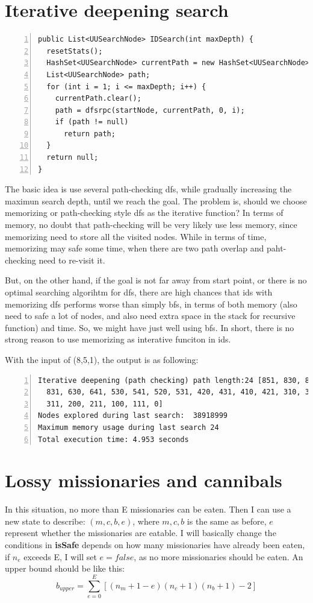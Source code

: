 \documentclass{article}
\begin{document}
\section{Iterative deepening search}

\begin{lstlisting}[numbers=left]
public List<UUSearchNode> IDSearch(int maxDepth) {
  resetStats();
  HashSet<UUSearchNode> currentPath = new HashSet<UUSearchNode>();
  List<UUSearchNode> path;
  for (int i = 1; i <= maxDepth; i++) {
    currentPath.clear();
    path = dfsrpc(startNode, currentPath, 0, i);
    if (path != null)
      return path;
  }
  return null;
}
\end{lstlisting}

The basic idea is use several path-checking dfs, while gradually increasing the maximun search depth, until we reach the goal. The problem is, should we choose memorizing or path-checking style dfs as the iterative function? In terms of memory, no doubt that path-checking will be very likely use less memory, since memorizing need to store all the visited nodes. While in terms of time, memorizing may safe some time, when there are two path overlap and paht-checking need to re-visit it. 

But, on the other hand, if the goal is not far away from start point, or there is no optimal searching algorihtm for dfs, there are high chances that ids with memorizing dfs performs worse than simply bfs, in terms of both memory (also need to safe a lot of nodes, and also need extra space in the stack for recursive function) and time. So, we might have just well using bfs. In short, there is no strong reason to use memorizing as interative funciton in ids.

With the input of (8,5,1), the output is as following:

\begin{lstlisting}[numbers=left]
Iterative deepening (path checking) path length:24 [851, 830, 841, 820,
  831, 630, 641, 530, 541, 520, 531, 420, 431, 410, 421, 310, 321, 300,
  311, 200, 211, 100, 111, 0]
Nodes explored during last search:  38918999
Maximum memory usage during last search 24
Total execution time: 4.953 seconds
\end{lstlisting}






\section{Lossy missionaries and cannibals}

In this situation, no more than E missionaries can be eaten. Then I can use a new state to describe: $(m, c, b, e)$, where $m, c, b$ is the same as before, $e$ represent whether the missionaries are eatable. I will basically change the conditions in \textbf{isSafe} depends on how many missionaries have already been eaten, if $n_e$ exceeds E, I will set $e = false$, as no more missionaries should be eaten. An upper bound should be like this:
$$b_{upper} = \sum_{e = 0}^E[(n_m + 1 - e)(n_c + 1)(n_b + 1) - 2]$$
\end{document}
